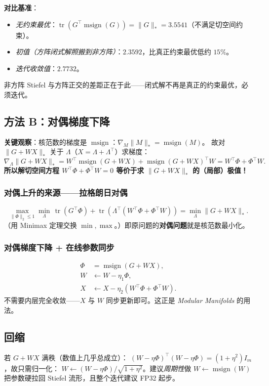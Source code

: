 \documentclass[11pt,a4paper]{article}
\theoremstyle{mythm}
\theoremstyle{mydef}
\newcommand{\tr}{\operatorname{tr}}
\newcommand{\msign}{\operatorname{msign}}
\newcommand{\nuc}{\ast}
\begin{document}
\textbf{对比基准}：
\begin{itemize}[leftmargin=2em]
\item \emph{无约束最优}：$\tr(G^\top \msign(G)) = \|G\|_\nuc = 3.5541$（不满足切空间约束）。
\item \emph{初值（方阵闭式解照搬到非方阵）}：$2.3592$，比真正约束最优低约 $15\%$。
\item \emph{迭代收敛值}：$2.7732$。
\end{itemize}
非方阵 Stiefel 与方阵正交的差距正在于此——闭式解不再是真正的约束最优，必须迭代。

\subsection{方法 B：对偶梯度下降}\label{sec:dual}

\textbf{关键观察}：核范数的梯度是 $\msign$：$\nabla_M \|M\|_\nuc = \msign(M)$。
故对 $\|G+WX\|_\nuc$ 关于 $\Lambda$（$X = \Lambda+\Lambda^\top$）求梯度：
$$\nabla_\Lambda \|G+WX\|_\nuc = W^\top \msign(G+WX) + \msign(G+WX)^\top W = W^\top\Phi + \Phi^\top W.$$
\textbf{所以解切空间方程 $W^\top\Phi+\Phi^\top W=0$ 等价于求 $\|G+WX\|_\nuc$ 的（局部）极值！}

\subsubsection*{对偶上升的来源——拉格朗日对偶}
$$\max_{\|\Phi\|_2\le 1}\min_{\Lambda}\, \tr(G^\top\Phi) + \tr(\Lambda^\top(W^\top\Phi+\Phi^\top W))
= \min_\Lambda \|G+WX\|_\nuc.$$
（用 Minimax 定理交换 $\min,\max$。）即原问题的\textbf{对偶问题}就是核范数最小化。

\subsubsection*{对偶梯度下降 + 在线参数同步}
\begin{equation}\label{eq:dual-iter}
\boxed{
\begin{aligned}
\Phi &= \msign(G+WX),\\
W &\leftarrow W - \eta_1 \Phi,\\
X &\leftarrow X - \eta_2 (W^\top\Phi + \Phi^\top W).
\end{aligned}
}
\end{equation}
不需要内层完全收敛——$X$ 与 $W$ 同步更新即可。这正是 \emph{Modular Manifolds} \cite{tml-mm} 的用法。

\subsection{回缩}
若 $G+WX$ 满秩（数值上几乎总成立）：
$(W-\eta\Phi)^\top(W-\eta\Phi) = (1+\eta^2)I_m$，故只需归一化：
$W \leftarrow (W-\eta\Phi)/\sqrt{1+\eta^2}$。建议\emph{周期性}做 $W \leftarrow \msign(W)$ 把参数硬拉回 Stiefel 流形，且整个迭代建议 FP32 起步。
\end{document}
